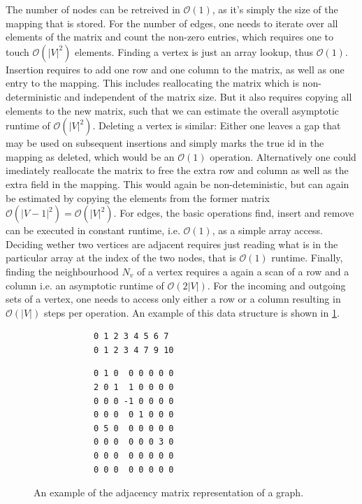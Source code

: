        The number of nodes can be retreived in $\mathcal{O}(1)$, as it's simply the size of the mapping that is stored.
        For the number of edges, one needs to iterate over all elements of the matrix and count the non-zero entries, which requires one to touch $\mathcal{O}(|V|^2)$ elements.
        Finding a vertex is just an array lookup, thus $\mathcal{O}(1)$.
        Insertion requires to add one row and one column to the matrix, as well as one entry to the mapping. 
        This includes reallocating the matrix which is non-deterministic and independent of the matrix size. But it also requires copying all elements to the new matrix, such that we can estimate the overall asymptotic runtime of $\mathcal{O}(|V|^2)$.
        Deleting a vertex is similar: Either one leaves a gap that may be used on subsequent insertions and simply marks the true id in the mapping as deleted, which would be an $\mathcal{O}(1)$ operation. 
        Alternatively one could imediately reallocate the matrix to free the extra row and column as well as the extra field in the mapping. 
        This would again be non-deteministic, but can again be estimated by copying the elements from the former matrix $\mathcal{O}(|V-1|^2) = \mathcal{O}(|V|^2)$.
        For edges, the basic operations find, insert and remove can be executed in constant runtime, i.e. $\mathcal{O}(1)$, as a simple array access.
        Deciding wether two vertices are adjacent requires just reading what is in the particular array at the index of the two nodes, that is $\mathcal{O}(1)$ runtime.
        Finally, finding the neighbourhood $N_v$ of a vertex requires a again a scan of a row and a column i.e. an asymptotic runtime of $\mathcal{O}(2|V|)$. For the incoming and outgoing sets of a vertex, one needs to access only either a row or a column resulting in $\mathcal{O}(|V|)$ steps per operation.
        An example of this data structure is shown in \ref{adm}.
        
        \begin{figure}[htp]
         \begin{center}
         \begin{verbatim}
            0 1 2 3 4 5 6 7
            0 1 2 3 4 7 9 10
          \end{verbatim}
          \begin{verbatim}
            0 1 0  0 0 0 0 0
            2 0 1  1 0 0 0 0
            0 0 0 -1 0 0 0 0
            0 0 0  0 1 0 0 0
            0 5 0  0 0 0 0 0
            0 0 0  0 0 0 3 0
            0 0 0  0 0 0 0 0
            0 0 0  0 0 0 0 0
          \end{verbatim}
         \end{center}
         \caption{An example of the adjacency matrix representation of a graph.}
         \label{adm}
        \end{figure}
        
